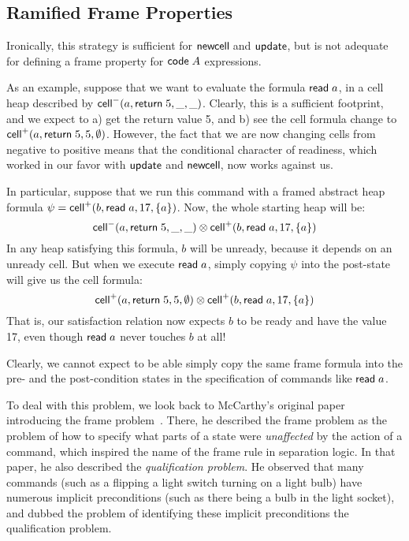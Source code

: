 \subsection{Ramified Frame Properties}

Ironically, this strategy is sufficient for $\mathsf{newcell}\;$and
$\mathsf{update}$, but is not adequate for defining a frame property
for $\mathsf{code}\;{A}$ expressions. 

As an example, suppose that we want to evaluate the formula $\mathsf{read}\;
a$, in a cell heap described by $\mathsf{cell}^{-}({a}, {\mathsf{return}\; 5}, {\_}, {\_})$.  Clearly,
this is a sufficient footprint, and we expect to a) get the return
value 5, and b) see the cell formula change to $\mathsf{cell}^{+}({a}, {\mathsf{return}\;
  5}, {5}, {\emptyset})$.  However, the fact that we are now changing cells
from negative to positive means that the conditional character of
readiness, which worked in our favor with $\mathsf{update}$ and
$\mathsf{newcell}\;\!\!$, now works against us.

In particular, suppose that we run this command with a framed abstract heap
formula $\psi = \mathsf{cell}^{+}({b}, {\mathsf{read}\; a}, {17}, {\{{a}\}})$. Now, the
whole starting heap will be:
\begin{displaymath}
\mathsf{cell}^{-}({a}, {\mathsf{return}\; 5}, {\_}, {\_}) \otimes \mathsf{cell}^{+}({b}, {\mathsf{read}\; a}, {17}, {\{{a}\}})  
\end{displaymath}
In any heap satisfying this formula, $b$ will be unready, because it depends 
on an unready cell. But when we execute $\mathsf{read}\; a$, simply copying $\psi$ 
into the post-state will give us the cell formula:
\begin{displaymath}
\mathsf{cell}^{+}({a}, {\mathsf{return}\; 5}, {5}, {\emptyset}) \otimes \mathsf{cell}^{+}({b}, {\mathsf{read}\; a}, {17}, {\{{a}\}})
\end{displaymath}
That is, our satisfaction relation now expects $b$ to be ready and have the 
value 17, even though $\mathsf{read}\; a$ never touches $b$ at all!

Clearly, we cannot expect to be able simply copy the same frame formula into 
the pre- and the post-condition states in the specification of commands like 
$\mathsf{read}\; a$. 

To deal with this problem, we look back to McCarthy's original paper
introducing the frame problem~\cite{mccarthy}. There, he described the
frame problem as the problem of how to specify what parts of a state
were \emph{unaffected} by the action of a command, which inspired the
name of the frame rule in separation logic. In that paper, he also
described the \emph{qualification problem}. He observed that many
commands (such as a flipping a light switch turning on a light bulb)
have numerous implicit preconditions (such as there being a bulb in
the light socket), and dubbed the problem of identifying these
implicit preconditions the qualification problem. 

